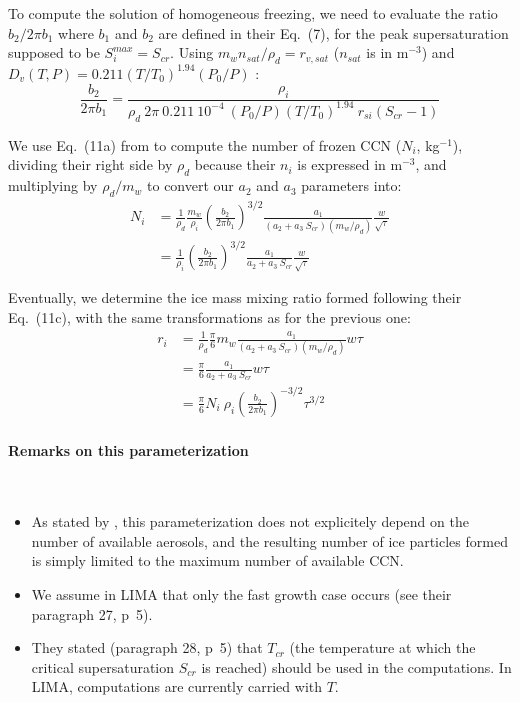 To compute the solution of homogeneous freezing, we need to evaluate the ratio $b_2 /2 \pi b_1$ where $b_1$ and $b_2$ are defined in their Eq.\ (7), for the peak supersaturation supposed to be $S_i^{max}=S_{cr}$. Using $m_w n_{sat} / \rho_d = r_{v,sat}$ ($n_{sat}$ is in m$^{-3}$) and $D_v(T,P) = 0.211 (T/T_0)^{1.94} (P_0/P)$ \citep[Eq.\ (13-3) from][with $D_v$ expressed in cm$^2$~s$^{-1}$]{Pruppacher1997}:
\begin{equation}
 \frac{b_2}{2 \pi b_1} = \frac{\rho_i}{\rho_d ~ 2 \pi~0.211~10^{-4} ~ (P_0/P) (T/T_0)^{1.94} ~ r_{si} (S_{cr}-1)}
\end{equation}

We use Eq.\ (11a) from \citet{Karcher2002} to compute the number of frozen CCN ($N_i$, kg$^{-1}$), dividing their right side by $\rho_d$ because their $n_i$ is expressed in m$^{-3}$, and multiplying by $\rho_d / m_w$ to convert our $a_2$ and $a_3$ parameters into:
\begin{align}
 N_i &= \frac{1}{\rho_d} \frac{m_w}{\rho_i} \left( \frac{b_2}{2 \pi b_1} \right)^{3/2} \frac{a_1}{(a_2 + a_3 ~ S_{cr})(m_w/\rho_d)} \frac{w}{\sqrt{\tau}} \\
 &= \frac{1}{\rho_i} \left( \frac{b_2}{2 \pi b_1} \right)^{3/2} \frac{a_1}{a_2 + a_3 ~ S_{cr}} \frac{w}{\sqrt{\tau}}
\end{align}

Eventually, we determine the ice mass mixing ratio formed following their Eq.\ (11c), with the same transformations as for the previous one:
\begin{align}
 r_i &= \frac{1}{\rho_d} \frac{\pi}{6} m_w \frac{a_1}{(a_2 + a_3 ~ S_{cr})(m_w/\rho_d)} w \tau \\
 &= \frac{\pi}{6} \frac{a_1}{a_2 + a_3 ~ S_{cr}} w \tau \\
 &= \frac{\pi}{6} N_i~\rho_i \left(\frac{b_2}{2 \pi b_1}\right)^{-3/2} \tau^{3/2} 
\end{align}

\paragraph{Remarks on this parameterization}
~\\
\begin{itemize}
 \item As stated by \citet{Karcher2002}, this parameterization does not explicitely depend on the number of available aerosols, and the resulting number of ice particles formed is simply limited to the maximum number of available CCN.
 \item We assume in LIMA that only the fast growth case occurs (see their paragraph 27, p~5).
 \item They stated (paragraph 28, p~5) that $T_{cr}$ (the temperature at which the critical supersaturation $S_{cr}$ is reached) should be used in the computations. In LIMA, computations are currently carried with $T$.
\end{itemize}

